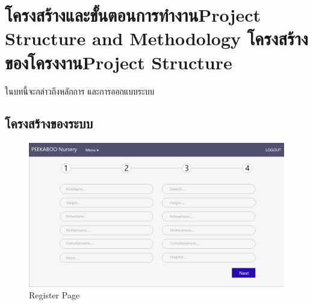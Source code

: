 \chapter{\ifproject%
\ifcpe โครงสร้างและขั้นตอนการทำงาน\else Project Structure and Methodology\fi
\else%
\ifcpe โครงสร้างของโครงงาน\else Project Structure\fi
\fi
}

ในบทนี้จะกล่าวถึงหลักการ และการออกแบบระบบ

\makeatletter


\makeatother



\section{โครงสร้างของระบบ}

\begin{figure}
  \begin{center}
  \includegraphics[width=\linewidth]{images/registerPage.png}
  \end{center}
  \caption[Poem]{Register Page}
  \label{fig:register}
  \end{figure}

